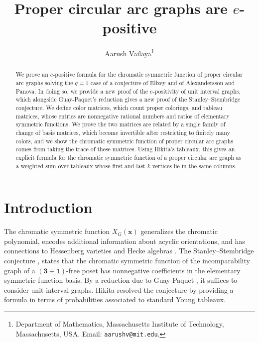 \documentclass[12pt]{article}
\title{Proper circular arc graphs are $e$-positive}
\author{Aarush Vailaya\thanks{Department of Mathematics, Massachusetts Institute of Technology, Massachusetts, USA. Email: \texttt{aarushv@mit.edu}.}}
\date{}
\theoremstyle{plain}
\theoremstyle{definition}
\theoremstyle{remark}
\begin{document}
\maketitle

\begin{abstract}
We prove an $e$-positive formula for the chromatic symmetric function of proper circular arc graphs solving the $q=1$ case of a conjecture of Ellzey and of Alexandersson and Panova. In doing so, we provide a new proof of the $e$-positivity of unit interval graphs, which alongside Guay-Paquet's reduction gives a new proof of the Stanley--Stembridge conjecture. We define color matrices, which count proper colorings, and tableau matrices, whose entries are nonnegative rational numbers and ratios of elementary symmetric functions. We prove the two matrices are related by a single family of change of basis matrices, which become invertible after restricting to finitely many colors, and we show the chromatic symmetric function of proper circular arc graphs comes from taking the trace of these matrices. Using Hikita's tableaux, this gives an explicit formula for the chromatic symmetric function of a proper circular arc graph as a weighted sum over tableaux whose first and last $k$ vertices lie in the same columns.


\end{abstract}

\section{Introduction}\label{section:introduction}
The chromatic symmetric function $X_G(\bm x)$ generalizes the chromatic
polynomial, encodes additional information about acyclic orientations, and
has connections to Hessenberg varieties \cite{dothessenberg,chromquasihessenberg}
and Hecke algebras \cite{chromhecke,chromcharacters}. The Stanley--Stembridge conjecture
\cite[Conjecture 5.1]{chromsym}, \cite[Conjecture 5.5]{stanstem} states that the chromatic symmetric function of the incomparability graph
of a $(\bm 3+\bm 1)$-free poset has nonnegative coefficients in the
elementary symmetric function basis. By a reduction due to Guay-Paquet
\cite[Theorem 5.1]{stanstemreduction}, it suffices to consider unit interval
graphs. Hikita \cite[Theorem 1.6 and Corollary 1.8]{stanstemproof} resolved
the conjecture by providing a formula in terms of probabilities associated
to standard Young tableaux.
\end{document}
